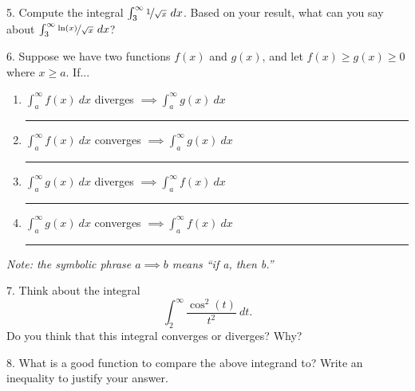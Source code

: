 \documentclass[11pt]{article}
\begin{document}
	\vspace{0.1\textheight}
	5. Compute the integral $\int_3^\infty \nicefrac{1}{\sqrt x} \ dx$. Based on your result, what can you say about $ \int_3^\infty \nicefrac{\ln(x)}{\sqrt x} \ dx$?
	
	\vspace{0.1\textheight}
	
	6. Suppose we have two functions $f(x)$ and $g(x)$, and let $f(x) \geq g(x) \geq 0$ where $x \geq a$. If...
	
		\begin{enumerate}[label=,itemindent=0.19\linewidth, itemsep=2pt]
			\item $\int_a^\infty f(x) \ dx$ diverges \hspace{0.3em} $ \implies \int_a^\infty g(x) \ dx$ \rule{3cm}{0.15mm}
			\item $\int_a^\infty f(x) \ dx$ converges $\implies \int_a^\infty g(x) \ dx$ \rule{3cm}{0.15mm}
			\item $\int_a^\infty g(x) \ dx$ diverges \hspace{0.4em} $ \implies \int_a^\infty f(x) \ dx$ \rule{3cm}{0.15mm}
			\item $\int_a^\infty g(x) \ dx$ converges $ \implies \int_a^\infty f(x) \ dx$ \rule{3cm}{0.15mm}
		\end{enumerate}
		\textit{Note: the symbolic phrase $a \implies b$ means ``if a, then b.''}
		
	\vspace{1em}
	\dotfill
	\vspace{2em}
	
	7. Think about the integral $$ \int_2^\infty \frac{\cos^2(t)}{t^2} \ dt. $$ Do you think that this integral converges or diverges? Why?
	
	\vspace{0.1\textheight}
	8. What is a good function to compare the above integrand to? Write an inequality to justify your answer.

	
\end{document}
